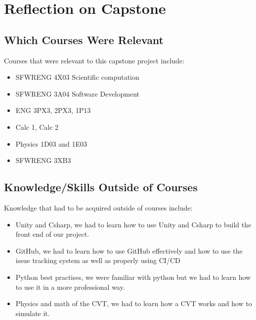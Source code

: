 \documentclass{article}
\begin{document}
\section{Reflection on Capstone}


\subsection{Which Courses Were Relevant}

\noindent Courses that were relevant to this capstone project include:\\
\begin{itemize}
    \item SFWRENG 4X03 Scientific computation
    \item SFWRENG 3A04 Software Development
    \item ENG 3PX3, 2PX3, 1P13 
    \item Calc 1, Calc 2
    \item Physics 1D03 and 1E03
    \item SFWRENG 3XB3 
\end{itemize}

\subsection{Knowledge/Skills Outside of Courses}

\noindent Knowledge that had to be acquired outside of courses include:\\
\begin{itemize}
    \item Unity and Csharp, we had to learn how to use Unity and Csharp to build the front end of our project.
    \item GitHub, we had to learn how to use GitHub effectively and how to use the issue tracking system as well as properly using CI/CD
    \item Python best practises, we were familiar with python but we had to learn how to use it in a more professional way.
    \item Physics and math of the CVT, we had to learn how a CVT works and how to simulate it.
\end{itemize}
\end{document}
